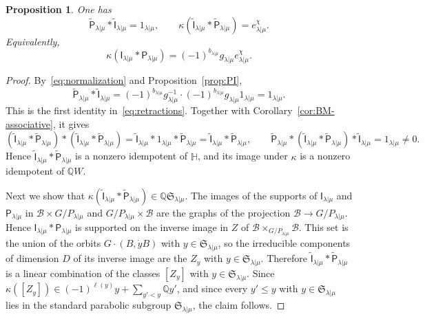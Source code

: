 \documentclass[11pt,a4paper]{amsart}
\newtheorem{proposition}[theorem]{Proposition}
\theoremstyle{definition}
\theoremstyle{remark}
\newcommand{\Q}{\mathbb Q}
\newcommand{\B}{\mathcal B}
\newcommand{\bH}{\mathbb H}
\newcommand{\lm}{\lambda|\mu}
\numberwithin{equation}{section}
\begin{document}
\begin{proposition}\label{prop:projector}
One has
\begin{equation}\label{eq:retractions}
\widetilde{\mathsf P}_{\lm}*\widetilde{\mathsf I}_{\lm}=1_{\lm},\qquad \kappa(\widetilde{\mathsf I}_{\lm}*\widetilde{\mathsf P}_{\lm})=e_{\lm}^\chi.
\end{equation}
Equivalently,
\begin{equation}\label{eq:IP}
\kappa(\mathsf I_{\lm}*\mathsf P_{\lm})=(-1)^{b_{\lm}}g_{\lm}e_{\lm}^\chi.
\end{equation}
\end{proposition}
\begin{proof}
By~\eqref{eq:normalization} and Proposition~\ref{prop:PI},
$$
\widetilde{\mathsf P}_{\lm}*\widetilde{\mathsf I}_{\lm}
=(-1)^{b_{\lm}}g_{\lm}^{-1}\cdot(-1)^{b_{\lm}}g_{\lm}1_{\lm}=1_{\lm}.
$$
This is the first identity in~\eqref{eq:retractions}. Together with
Corollary~\ref{cor:BM-associative}, it gives
$$
(\widetilde{\mathsf I}_{\lm}*\widetilde{\mathsf P}_{\lm})
*(\widetilde{\mathsf I}_{\lm}*\widetilde{\mathsf P}_{\lm})
=\widetilde{\mathsf I}_{\lm}*1_{\lm}*\widetilde{\mathsf P}_{\lm}
=\widetilde{\mathsf I}_{\lm}*\widetilde{\mathsf P}_{\lm},
\qquad
\widetilde{\mathsf P}_{\lm}*(\widetilde{\mathsf I}_{\lm}*\widetilde{\mathsf P}_{\lm})
*\widetilde{\mathsf I}_{\lm}=1_{\lm}\neq0 .
$$
Hence $\widetilde{\mathsf I}_{\lm}*\widetilde{\mathsf P}_{\lm}$ is a nonzero
idempotent of $\bH$, and its image under $\kappa$ is a nonzero idempotent
of $\Q W$.

Next we show that
$\kappa(\widetilde{\mathsf I}_{\lm}*\widetilde{\mathsf P}_{\lm})\in
\Q\mathfrak S_{\lm}$. The images of the supports of $\mathsf I_{\lm}$ and
$\mathsf P_{\lm}$ in $\B\times G/P_{\lm}$ and $G/P_{\lm}\times\B$ are the
graphs of the projection $\B\to G/P_{\lm}$. Hence
$\mathsf I_{\lm}*\mathsf P_{\lm}$ is supported on the inverse image in $Z$
of $\B\times_{G/P_{\lm}}\B$. This set is the union of the orbits
$G\cdot(B,\dot yB)$ with $y\in\mathfrak S_{\lm}$, so the irreducible
components of dimension $D$ of its inverse image are the $Z_y$ with
$y\in\mathfrak S_{\lm}$. Therefore
$\widetilde{\mathsf I}_{\lm}*\widetilde{\mathsf P}_{\lm}$ is a linear
combination of the classes $[Z_y]$ with $y\in\mathfrak S_{\lm}$. Since
$\kappa([Z_y])\in(-1)^{\ell(y)}y+\sum_{y'<y}\Q y'$, and since every $y'\le y$
with $y\in\mathfrak S_{\lm}$ lies in the standard parabolic subgroup
$\mathfrak S_{\lm}$, the claim follows.


\end{proof}
\end{document}
